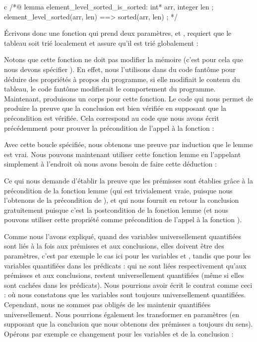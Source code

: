 \begin{CodeBlock}{c}
/*@
  lemma element_level_sorted_is_sorted:
    \forall int* arr, integer len ;
       element_level_sorted(arr, len) ==> sorted(arr, len) ;
*/
\end{CodeBlock}


Écrivons donc une fonction qui prend deux paramètres,  et
, requiert que le tableau soit trié localement et assure
qu'il est trié globalement :




Notons que cette fonction ne doit pas modifier la mémoire (c'est pour cela que
nous devons spécifier ).
En effet, nous l'utilisons dans du code fantôme pour déduire des propriétés
à propos du programme, si elle modifiait le contenu du tableau,
le code fantôme modifierait le comportement du programme. Maintenant, produisons un
corps pour cette fonction. Le code qui nous permet de produire la preuve que la conclusion est
bien vérifiée en supposant que la précondition est vérifiée. Cela correspond au
code que nous avons écrit précédemment pour prouver la précondition de l'appel à
la fonction  :





Avec cette boucle spécifiée, nous obtenons une preuve par induction que le lemme
est vrai. Nous pouvons maintenant utiliser cette fonction lemme en
l'appelant simplement à l'endroit où nous avons besoin de faire cette
déduction :




Ce qui nous demande d'établir la preuve que les prémisses sont établies grâce
à la précondition de la fonction lemme (qui est trivialement vraie,
puisque nous l'obtenons de la précondition de ), et
qui nous fournit en retour la conclusion gratuitement puisque c'est la postcondition
de la fonction lemme (et nous pouvons utiliser cette propriété comme
précondition de l'appel à la fonction ).


Comme nous l'avons expliqué, quand des variables universellement quantifiées
sont liés à la fois aux prémisses et aux conclusions, elles doivent être des
paramètres, c'est par exemple le cas ici pour les variables 
et , tandis que pour les variables quantifiées dans les
prédicats :
qui ne sont liées respectivement qu'aux prémisses et aux conclusions,
restent universellement quantifiées (même si elles sont cachées dans les
prédicats). Nous pourrions avoir écrit le contrat comme ceci :
où nous constatons que les variables sont toujours universellement
quantifiées. Cependant, nous ne sommes pas obligés de les maintenir quantifiées
universellement. Nous pourrions également les transformer en paramètres
(en supposant que la conclusion que nous obtenons des prémisses a toujours du
sens). Opérons par exemple ce changement pour les variables  et
 de la conclusion :



